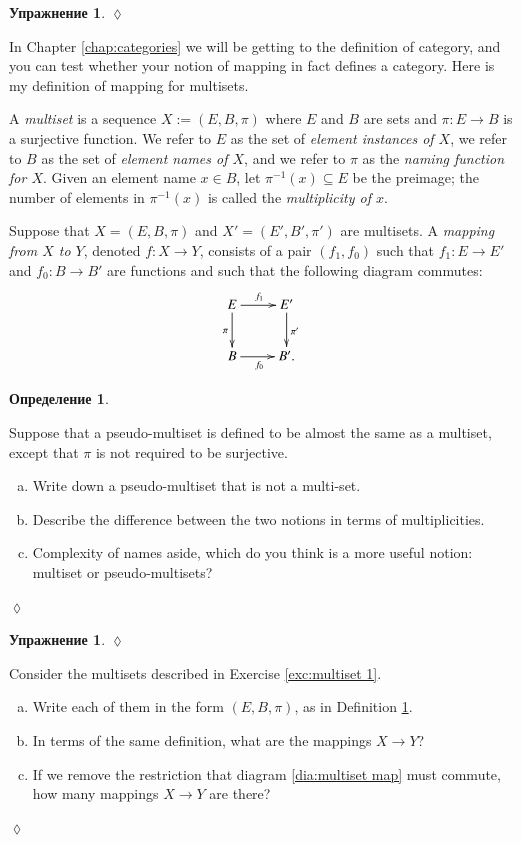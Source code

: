 \documentclass[a4paper]{book}
\def\to{\rightarrow}
\def\taking{\colon}
\def\ss{\subseteq}
\def\m1{{-1}}
\theoremstyle{myth}
\newtheorem{excENG}[envENG]{\begin{english}Exercise\end{english}}
\newtheorem{definitionENG}[envENG]{\begin{english}Definition\end{english}}
\newenvironment{exerciseENG}{\begin{excENG}}{\hspace*{\fill}$\lozenge$\end{excENG}}
\newtheorem{excRUS}[envRUS]{Упражнение}
\newtheorem{definitionRUS}[envRUS]{Определение}
\newenvironment{exerciseRUS}{\begin{excRUS}}{\hspace*{\fill}$\lozenge$\end{excRUS}}
\def\sexc{\begin{enumerate}[a.)]\setlength{\itemsep}{.1cm}\setlength{\parskip}{.1cm}\item}
\def\next{\item}
\def\endsexc{\end{enumerate}}
\begin{document}
\begin{russian}
\begin{exerciseRUS}
\end{exerciseRUS}

In Chapter \ref{chap:categories} we will be getting to the definition of category, and you can test whether your notion of mapping in fact defines a category. Here is my definition of mapping for multisets.

 

\begin{definitionENG}\label{def:multiset}
A {\em multiset} is a sequence $X:=(E,B,\pi)$ where $E$ and $B$ are sets and $\pi\taking E\to B$ is a surjective function. We refer to $E$ as the set of {\em element instances of $X$}, we refer to $B$ as the set of {\em element names of $X$}, and we refer to $\pi$ as the {\em naming function for $X$}. Given an element name $x\in B$, let $\pi^\m1(x)\ss E$ be the preimage; the number of elements in $\pi^\m1(x)$ is called the {\em multiplicity of $x$}.

Suppose that $X=(E,B,\pi)$ and $X'=(E',B',\pi')$ are multisets. A {\em mapping from $X$ to $Y$}, denoted $f\taking X\to Y$, consists of a pair $(f_1,f_0)$ such that $f_1\taking E\to E'$ and $f_0\taking B\to B'$ are functions and such that the following diagram commutes:
\begin{align}\label{dia:multiset map}
\xymatrix{E\ar[r]^{f_1}\ar[d]_{\pi}&E'\ar[d]^{\pi'}\\B\ar[r]_{f_0}&B'.}
\end{align}
\end{definitionENG}

\begin{definitionRUS}\label{def:multiset}
 
\end{definitionRUS}

\begin{exerciseENG}
Suppose that a pseudo-multiset is defined to be almost the same as a multiset, except that $\pi$ is not required to be surjective. 
\sexc Write down a pseudo-multiset that is not a multi-set. 
\next Describe the difference between the two notions in terms of multiplicities. 
\next Complexity of names aside, which do you think is a more useful notion: multiset or pseudo-multisets? 
\endsexc
\end{exerciseENG}

\begin{exerciseRUS}
 
\end{exerciseRUS}

\begin{exerciseENG}
Consider the multisets described in Exercise \ref{exc:multiset 1}. 
\sexc Write each of them in the form $(E,B,\pi)$, as in Definition \ref{def:multiset}. 
\next In terms of the same definition, what are the mappings $X\to Y$? 
\next If we remove the restriction that diagram \ref{dia:multiset map} must commute, how many mappings $X\to Y$ are there?
\endsexc
\end{exerciseENG}


\end{russian}
\end{document}
